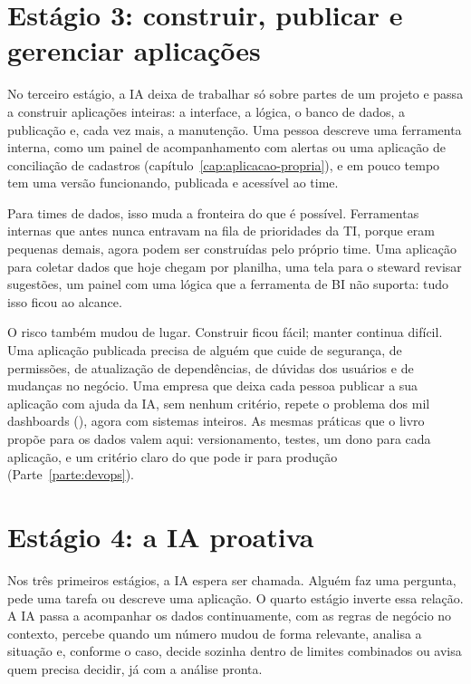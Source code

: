 \section{Estágio 3: construir, publicar e gerenciar aplicações}
\label{sec:estagio-aplicacoes}

No terceiro estágio, a IA deixa de trabalhar só sobre partes de um projeto e passa a
construir aplicações inteiras: a interface, a lógica, o banco de dados, a publicação e, cada
vez mais, a manutenção. Uma pessoa descreve uma ferramenta interna, como um painel de
acompanhamento com alertas ou uma aplicação de conciliação de cadastros
(capítulo~\ref{cap:aplicacao-propria}), e em pouco tempo tem uma versão funcionando,
publicada e acessível ao time.

Para times de dados, isso muda a fronteira do que é possível. Ferramentas internas que antes
nunca entravam na fila de prioridades da TI, porque eram pequenas demais, agora podem ser
construídas pelo próprio time. Uma aplicação para coletar dados que hoje chegam por planilha,
uma tela para o steward revisar sugestões, um painel com uma lógica que a ferramenta de BI
não suporta: tudo isso ficou ao alcance.

O risco também mudou de lugar. Construir ficou fácil; manter continua difícil. Uma aplicação
publicada precisa de alguém que cuide de segurança, de permissões, de atualização de
dependências, de dúvidas dos usuários e de mudanças no negócio. Uma empresa que deixa cada
pessoa publicar a sua aplicação com ajuda da IA, sem nenhum critério, repete o problema dos
mil dashboards (), agora com sistemas inteiros. As mesmas práticas
que o livro propõe para os dados valem aqui: versionamento, testes, um dono para cada
aplicação, e um critério claro do que pode ir para produção (Parte~\ref{parte:devops}).

\section{Estágio 4: a IA proativa}
\label{sec:estagio-proativa}

Nos três primeiros estágios, a IA espera ser chamada. Alguém faz uma pergunta, pede uma
tarefa ou descreve uma aplicação. O quarto estágio inverte essa relação. A IA passa a
acompanhar os dados continuamente, com as regras de negócio no contexto, percebe quando um
número mudou de forma relevante, analisa a situação e, conforme o caso, decide sozinha dentro
de limites combinados ou avisa quem precisa decidir, já com a análise pronta.

